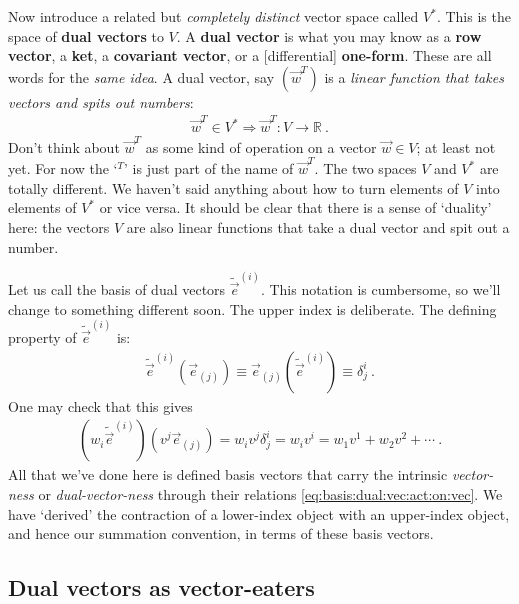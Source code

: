 Now introduce a related but \emph{completely distinct} vector space called $V^*$. This is the space of \textbf{dual vectors} to $V$. A \textbf{dual vector} is what you may know as a \textbf{row vector}, a \textbf{ket}, a \textbf{covariant vector}, or a [differential] \textbf{one-form}. These are all words for the \emph{same idea}. A dual vector, say $(\vec{w}^T)$ is a \emph{linear function that takes vectors and spits out numbers}:
\begin{align}
  \vec{w}^T \in V^* \Rightarrow \vec{w}^T: V \to \mathbb{R} \ .
 \end{align}
Don’t think about $\vec{w}^T$ as some kind of operation on a vector $\vec{w}\in V$; at least not yet. For now the `$^T$' is just part of the name of $\vec{w}^T$. The two spaces $V$ and $V^*$ are totally different. We haven’t said anything about how to turn elements of $V$ into elements of $V^*$ or vice versa.
%
It should be clear that there is a sense of `duality’ here: the vectors $V$ are also linear functions that take a dual vector and spit out a number. 

Let us call the basis of dual vectors $\tilde{\vec{e}}^{(i)}$. This notation is cumbersome, so we’ll change to something different soon. The upper index is deliberate. The defining property of $\tilde{\vec{e}}^{(i)}$ is:
\begin{align}
  \tilde{\vec{e}}^{(i)}\left(\vec{e}_{(j)}\right) 
  \equiv 
  \vec{e}_{(j)}\left(\tilde{\vec{e}}^{(i)}\right) 
  \equiv
  \delta^i_j \ .
  \label{eq:basis:dual:vec:act:on:vec}
\end{align}
One may check that this gives
\begin{align}
  \left(w_i\tilde{\vec{e}}^{(i)}\right)\left(v^j\vec{e}_{(j)}\right)
  = w_i v^j \delta^i_j = w_i v^i = w_1 v^1 + w_2 v^2 + \cdots \ .
  \label{eq:oneform:eats:vector:basis}
\end{align}
All that we've done here is defined basis vectors that carry the intrinsic \emph{vector-ness} or \emph{dual-vector-ness} through their relations \eqref{eq:basis:dual:vec:act:on:vec}. We have `derived' the contraction of a lower-index object with an upper-index object, and hence our summation convention, in terms of these basis vectors.

\subsection{Dual vectors as vector-eaters}

